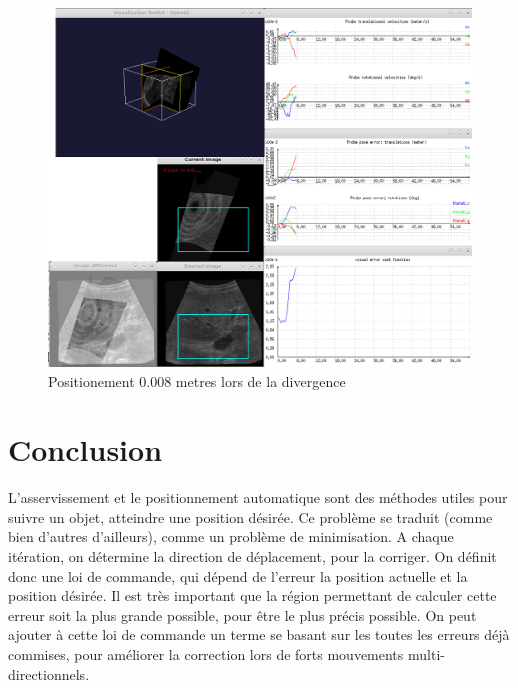 \documentclass[a4paper,11pt]{article}
\begin{document}
\begin{figure}[H]
    \centering
    \includegraphics[width=0.5\textheight]{./images/q13_0,008_end.png}
    \caption{ Positionement 0.008 metres lors de la divergence }
    \label{q13_4}
\end{figure}

\section{Conclusion}
L'asservissement et le positionnement automatique sont des m\'ethodes utiles pour suivre un objet, atteindre une position d\'esir\'ee. Ce probl\`eme se traduit (comme bien d'autres d'ailleurs), comme un probl\`eme de minimisation. A chaque it\'eration, on d\'etermine la direction de d\'eplacement, pour la corriger. On d\'efinit donc une loi de commande, qui d\'epend de l'erreur la position actuelle et la position d\'esir\'ee. Il est tr\`es important que la r\'egion permettant de calculer cette erreur soit la plus grande possible, pour \^etre le plus pr\'ecis possible. On peut ajouter \`a cette loi de commande un terme se basant sur les toutes les erreurs d\'ej\`a commises, pour am\'eliorer la correction lors de forts mouvements multi-directionnels.
\end{document}
